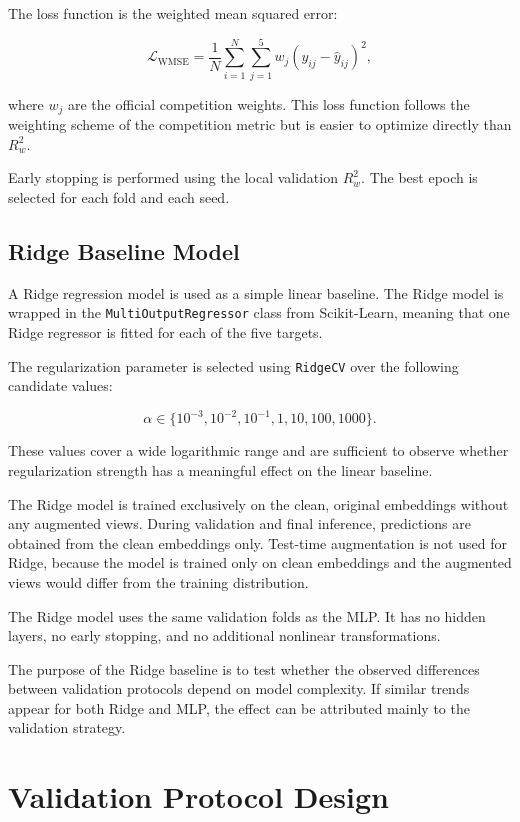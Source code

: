 The loss function is the weighted mean squared error:

\[
\mathcal{L}_{\text{WMSE}} =
\frac{1}{N}
\sum_{i=1}^{N}
\sum_{j=1}^{5}
w_j \left(y_{ij} - \hat{y}_{ij}\right)^2,
\]

where $w_j$ are the official competition weights. This loss function follows the weighting scheme of the competition metric but is easier to optimize directly than $R^2_w$.

Early stopping is performed using the local validation $R^2_w$. The best epoch is selected for each fold and each seed.

\subsection{Ridge Baseline Model}

A Ridge regression model is used as a simple linear baseline. The Ridge model is wrapped in the \texttt{MultiOutputRegressor} class from Scikit-Learn, meaning that one Ridge regressor is fitted for each of the five targets.

The regularization parameter is selected using \texttt{RidgeCV} over the following candidate values:

\[
\alpha \in \{10^{-3}, 10^{-2}, 10^{-1}, 1, 10, 100, 1000\}.
\]

These values cover a wide logarithmic range and are sufficient to observe whether regularization strength has a meaningful effect on the linear baseline.

The Ridge model is trained exclusively on the clean, original embeddings without any augmented views. During validation and final inference, predictions are obtained from the clean embeddings only. Test-time augmentation is not used for Ridge, because the model is trained only on clean embeddings and the augmented views would differ from the training distribution.

The Ridge model uses the same validation folds as the MLP. It has no hidden layers, no early stopping, and no additional nonlinear transformations.

The purpose of the Ridge baseline is to test whether the observed differences between validation protocols depend on model complexity. If similar trends appear for both Ridge and MLP, the effect can be attributed mainly to the validation strategy.

\section{Validation Protocol Design}


